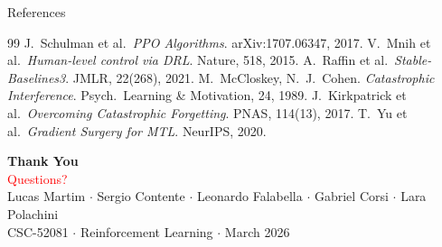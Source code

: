\documentclass[aspectratio=169, 12pt]{beamer}
\begin{document}
\begin{frame}[allowframebreaks]{References}
\footnotesize
\begin{thebibliography}{99}
 J.~Schulman et al.\ \emph{PPO Algorithms}. arXiv:1707.06347, 2017.
 V.~Mnih et al.\ \emph{Human-level control via DRL}. Nature, 518, 2015.
 A.~Raffin et al.\ \emph{Stable-Baselines3}. JMLR, 22(268), 2021.
 M.~McCloskey, N.~J.~Cohen. \emph{Catastrophic Interference}. Psych.\ Learning \& Motivation, 24, 1989.
 J.~Kirkpatrick et al.\ \emph{Overcoming Catastrophic Forgetting}. PNAS, 114(13), 2017.
 T.~Yu et al.\ \emph{Gradient Surgery for MTL}. NeurIPS, 2020.
\end{thebibliography}
\end{frame}

\begin{frame}
\begin{center}
  \vspace{1cm}
  {\Huge\textbf{Thank You}}\\[12pt]
  {\large\textcolor{red}{Questions?}}\\[20pt]
  {\small Lucas Martim $\cdot$ Sergio Contente $\cdot$ Leonardo Falabella $\cdot$ Gabriel Corsi $\cdot$ Lara Polachini}\\[8pt]
  {\footnotesize CSC-52081 $\cdot$ Reinforcement Learning $\cdot$ March 2026}
\end{center}
\end{frame}
\end{document}
